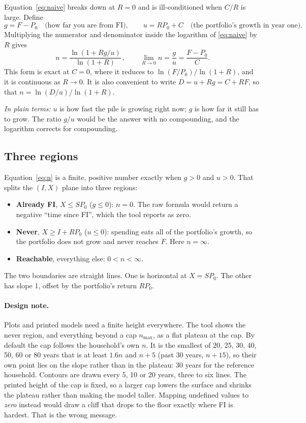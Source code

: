 \documentclass[11pt,letterpaper]{article}
\newcommand{\plain}[1]{\par\smallskip\noindent\textcolor{mpgrey}{\textit{In plain terms:} #1}\par\smallskip}
\newcommand{\gap}{g}
\begin{document}
Equation~\eqref{eq:naive} breaks down at $R = 0$ and is ill-conditioned when $C/R$ is large. Define
\begin{equation}
\gap = F - P_0 \quad\text{(how far you are from FI)}, \qquad u = R P_0 + C \quad\text{(the portfolio's growth in year one)}.
\end{equation}
Multiplying the numerator and denominator inside the logarithm of \eqref{eq:naive} by $R$ gives
\begin{equation}
\boxed{\,n = \frac{\ln\!\left(1 + R\gap/u\right)}{\ln(1+R)}\,}, \qquad \lim_{R \to 0} n = \frac{\gap}{u} = \frac{F - P_0}{C}.
\label{eq:n}
\end{equation}
This form is exact at $C = 0$, where it reduces to $\ln(F/P_0)/\ln(1+R)$, and it is continuous as $R \to 0$. It is also convenient to write $D = u + R\gap = C + RF$, so that $n = \ln(D/u)/\ln(1+R)$.

\plain{$u$ is how fast the pile is growing right now; $\gap$ is how far it still has to grow. The ratio $\gap/u$ would be the answer with no compounding, and the logarithm corrects for compounding.}

\subsection{Three regions}

Equation~\eqref{eq:n} is a finite, positive number exactly when $\gap > 0$ and $u > 0$. That splits the $(I, X)$ plane into three regions:
\begin{itemize}
\setlength\itemsep{1pt}
\item \textbf{Already FI}, $X \le S P_0$ ($\gap \le 0$): $n = 0$. The raw formula would return a negative ``time since FI'', which the tool reports as zero.
\item \textbf{Never}, $X \ge I + R P_0$ ($u \le 0$): spending eats all of the portfolio's growth, so the portfolio does not grow and never reaches $F$. Here $n = \infty$.
\item \textbf{Reachable}, everything else: $0 < n < \infty$.
\end{itemize}
The two boundaries are straight lines. One is horizontal at $X = SP_0$. The other has slope 1, offset by the portfolio's return $RP_0$.

\paragraph{Design note.} Plots and printed models need a finite height everywhere. The tool shows the never region, and everything beyond a cap $n_{\max}$, as a flat plateau at the cap. By default the cap follows the household's own $n$. It is the smallest of 20, 25, 30, 40, 50, 60 or 80 years that is at least $1.6n$ and $n + 5$ (past 30 years, $n + 15$), so their own point lies on the slope rather than in the plateau: 30 years for the reference household. Contours are drawn every 5, 10 or 20 years, three to six lines. The printed height of the cap is fixed, so a larger cap lowers the surface and shrinks the plateau rather than making the model taller. Mapping undefined values to \emph{zero} instead would draw a cliff that drops to the floor exactly where FI is hardest. That is the wrong message.
\end{document}
